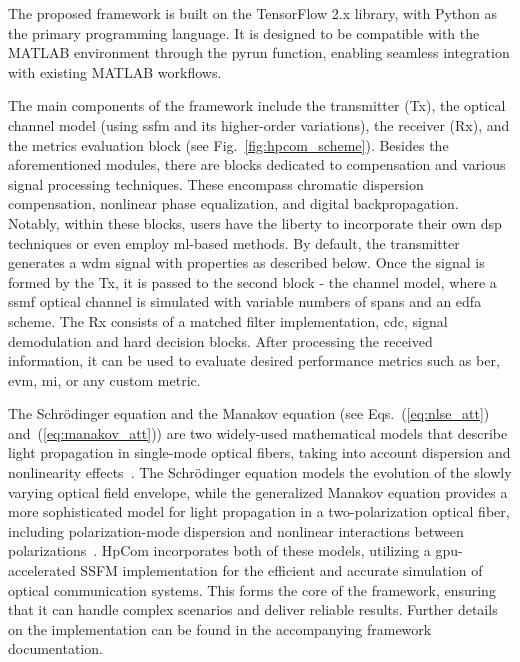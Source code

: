 The proposed framework is built on the TensorFlow 2.x library, with Python as the primary programming language. It is designed to be compatible with the MATLAB environment through the \textrm{pyrun} function, enabling seamless integration with existing MATLAB workflows.

The main components of the framework include the transmitter (Tx), the optical channel model (using \Gls{ssfm} and its higher-order variations), the receiver (Rx), and the metrics evaluation block (see Fig.~\ref{fig:hpcom_scheme}). Besides the aforementioned modules, there are blocks dedicated to compensation and various signal processing techniques. These encompass chromatic dispersion compensation, nonlinear phase equalization, and digital backpropagation. Notably, within these blocks, users have the liberty to incorporate their own \Gls{dsp} techniques or even employ \Gls{ml}-based methods. By default, the transmitter generates a \acrshort{wdm} signal with properties as described below. Once the signal is formed by the Tx, it is passed to the second block - the channel model, where a \gls{ssmf} optical channel is simulated with variable numbers of spans and an \acrfull{edfa} scheme. The Rx consists of a matched filter implementation, \acrfull{cdc}, signal demodulation and hard decision blocks. After processing the received information, it can be used to evaluate desired performance metrics such as \acrshort{ber}, \acrshort{evm}, \acrshort{mi}, or any custom metric.

The Schr\"odinger equation and the Manakov equation (see Eqs.~(\ref{eq:nlse_att}) and~(\ref{eq:manakov_att})) are two widely-used mathematical models that describe light propagation in single-mode optical fibers, taking into account dispersion and nonlinearity effects~\cite{agrawal2013nonlinear}. The Schr\"odinger equation models the evolution of the slowly varying optical field envelope, while the generalized Manakov equation provides a more sophisticated model for light propagation in a two-polarization optical fiber, including polarization-mode dispersion and nonlinear interactions between polarizations~\cite{poletti2008description, mumtaz2012nonlinear}.
HpCom incorporates both of these models, utilizing a \acrshort{gpu}-accelerated SSFM implementation for the efficient and accurate simulation of optical communication systems. This forms the core of the framework, ensuring that it can handle complex scenarios and deliver reliable results. Further details on the implementation can be found in the accompanying framework documentation\cite{esf0_2023_7880552}.

